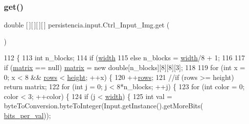\subsubsection{\texorpdfstring{get()}{get()}}
{\footnotesize\ttfamily double \mbox{[}$\,$\mbox{]}\mbox{[}$\,$\mbox{]}\mbox{[}$\,$\mbox{]}\mbox{[}$\,$\mbox{]} persistencia.\+input.\+Ctrl\+\_\+\+Input\+\_\+\+Img.\+get (\begin{DoxyParamCaption}{ }\end{DoxyParamCaption})\hspace{0.3cm}{\ttfamily [inline]}}


\begin{DoxyCode}
112     \{
113         \textcolor{keywordtype}{int} n\_blocks;
114         \textcolor{keywordflow}{if} (\hyperlink{classpersistencia_1_1input_1_1Ctrl__Input__Img_a51dd0b9243b854aa25ac4532acca4524}{width}%
115         \textcolor{keywordflow}{else} n\_blocks = \hyperlink{classpersistencia_1_1input_1_1Ctrl__Input__Img_a51dd0b9243b854aa25ac4532acca4524}{width}/8 + 1;
116 
117         \textcolor{keywordflow}{if} (\hyperlink{classpersistencia_1_1input_1_1Ctrl__Input__Img_ae61f4eb4fa38ea6dfb1e03f443711948}{matrix} == null) \hyperlink{classpersistencia_1_1input_1_1Ctrl__Input__Img_ae61f4eb4fa38ea6dfb1e03f443711948}{matrix} = \textcolor{keyword}{new} \textcolor{keywordtype}{double}[n\_blocks][8][8][3];
118 
119         \textcolor{keywordflow}{for} (\textcolor{keywordtype}{int} x = 0; x < 8 && \hyperlink{classpersistencia_1_1input_1_1Ctrl__Input__Img_a1288870f941a6730df2aadbb767f6e6f}{rows} < \hyperlink{classpersistencia_1_1input_1_1Ctrl__Input__Img_abc1dcc48714e9e74fb8ae0e0b81f91bf}{height}; ++x) \{
120             ++\hyperlink{classpersistencia_1_1input_1_1Ctrl__Input__Img_a1288870f941a6730df2aadbb767f6e6f}{rows};
121             \textcolor{comment}{//if (rows >= height) return matrix;}
122             \textcolor{keywordflow}{for} (\textcolor{keywordtype}{int} j = 0; j < 8*n\_blocks; ++j) \{
123                 \textcolor{keywordflow}{for} (\textcolor{keywordtype}{int} color = 0; color < 3; ++color) \{
124                     \textcolor{keywordflow}{if} (j < \hyperlink{classpersistencia_1_1input_1_1Ctrl__Input__Img_a51dd0b9243b854aa25ac4532acca4524}{width}) \{
125                         \textcolor{keywordtype}{int} val = byteToConversion.byteToInteger(Input.getInstance().getMoreBits(
      \hyperlink{classpersistencia_1_1input_1_1Ctrl__Input__Img_a222ad0e7d241e5f396cf67c3b760f143}{bits\_per\_val}));

\end{DoxyCode}
